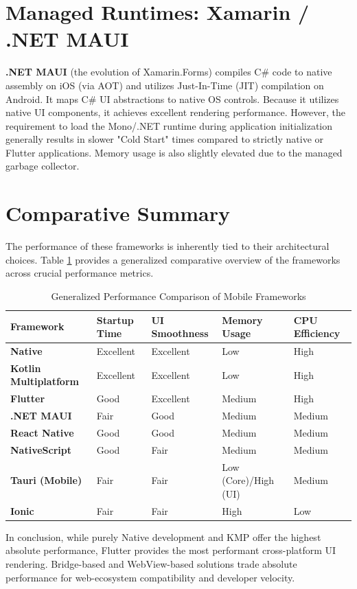 \section{Managed Runtimes: Xamarin / .NET MAUI}
\textbf{.NET MAUI} (the evolution of Xamarin.Forms) compiles C\# code to native assembly on iOS (via AOT) and utilizes Just-In-Time (JIT) compilation on Android. It maps C\# UI abstractions to native OS controls. Because it utilizes native UI components, it achieves excellent rendering performance. However, the requirement to load the Mono/.NET runtime during application initialization generally results in slower "Cold Start" times compared to strictly native or Flutter applications. Memory usage is also slightly elevated due to the managed garbage collector. \cite{PF:NET:01}

\section{Comparative Summary}

The performance of these frameworks is inherently tied to their architectural choices. Table \ref{tab:perf_summary} provides a generalized comparative overview of the frameworks across crucial performance metrics.

\begin{table}[htbp]
\centering
\caption{Generalized Performance Comparison of Mobile Frameworks}
\label{tab:perf_summary}
\renewcommand{\arraystretch}{1.3}
\begin{tabularx}{\textwidth}{|X|X|X|X|X|}
\hline
\textbf{Framework} & \textbf{Startup Time} & \textbf{UI Smoothness} & \textbf{Memory Usage} & \textbf{CPU Efficiency} \\ \hline
\textbf{Native} & Excellent & Excellent & Low & High \\ \hline
\textbf{Kotlin Multiplatform} & Excellent & Excellent & Low & High \\ \hline
\textbf{Flutter} & Good & Excellent & Medium & High \\ \hline
\textbf{.NET MAUI} & Fair & Good & Medium & Medium \\ \hline
\textbf{React Native} & Good & Good & Medium & Medium \\ \hline
\textbf{NativeScript} & Good & Fair & Medium & Medium \\ \hline
\textbf{Tauri (Mobile)} & Fair & Fair & Low (Core)/High (UI)& Medium \\ \hline
\textbf{Ionic} & Fair & Fair & High & Low \\ \hline
\end{tabularx}
\end{table}

In conclusion, while purely Native development and KMP offer the highest absolute performance, Flutter provides the most performant cross-platform UI rendering. Bridge-based and WebView-based solutions trade absolute performance for web-ecosystem compatibility and developer velocity.
